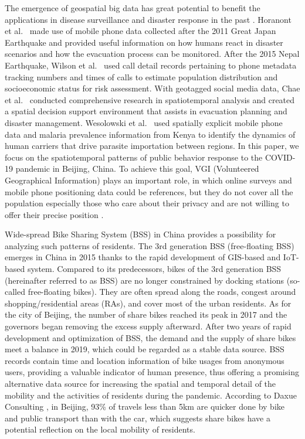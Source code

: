 \documentclass[ijgi,submit,moreauthors,pdftex]{Definitions/mdpi}
\begin{document}
The emergence of geospatial big data has great potential to benefit the applications in disease surveillance and disaster response in the past \cite{Yu2018Big, Goodchild2010Crowdsourcing, Huang2015Predicating}.
Horanont et al.\ \cite{Horanont2013Auto} made use of mobile phone data collected after the 2011 Great Japan Earthquake and provided useful information on how humans react in disaster scenarios and how the evacuation process can be monitored.
After the 2015 Nepal Earthquake, Wilson et al.\ \cite{Wilson2016Rapid} used call detail records pertaining to phone metadata tracking numbers and times of calls to estimate population distribution and socioeconomic status for risk assessment.
With geotagged social media data, Chae et al.\ \cite{CHAE2013Public} conducted comprehensive research in spatiotemporal analysis and created a spatial decision support environment that assists in evacuation planning and disaster management.
Wesolowski et al.\ \cite{Wesolowski2012Quantifying} used spatially explicit mobile phone data and malaria prevalence information from Kenya to identify the dynamics of human carriers that drive parasite importation between regions. 
In this paper, we focus on the spatiotemporal patterns of public behavior response to the COVID-19 pandemic in Beijing, China.
To achieve this goal, VGI (Volunteered Geographical Information) plays an important role, in which online surveys and mobile phone positioning data could be references, but they do not cover all the population especially those who care about their privacy and are not willing to offer their precise position \cite{Li2016ISPRS}. 

Wide-spread Bike Sharing System (BSS) in China provides a possibility for analyzing such patterns of residents.
The 3rd generation BSS (free-floating BSS) emerges in China in 2015 thanks to the rapid development of GIS-based and IoT-based system. 
Compared to its predecessors, bikes of the 3rd generation BSS (hereinafter referred to as BSS) are no longer constrained by docking stations (so-called free-floating bikes).
They are often spread along the roads, congest around shopping/residential areas (RAs), and cover most of the urban residents. 
As for the city of Beijing, the number of share bikes reached its peak in 2017 and the governors began removing the excess supply afterward. 
After two years of rapid development and optimization of BSS, the demand and the supply of share bikes meet a balance in 2019, which could be regarded as a stable data source.
BSS records contain time and location information of bike usages from anonymous users, providing a valuable indicator of human presence, thus offering a promising alternative data source for increasing the spatial and temporal detail of the mobility and the activities of residents during the pandemic.
According to Daxue Consulting \cite{bssmodel}, in Beijing, 93\% of travels less than 5km are quicker done by bike and public transport than with the car, which suggests share bikes have a potential reflection on the local mobility of residents.
\end{document}
